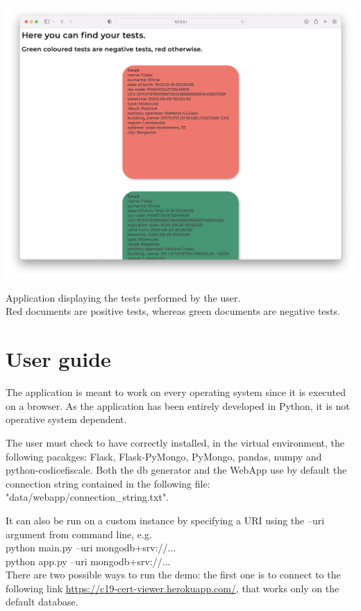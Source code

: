 \documentclass{article}
\begin{document}
\begin{center}
\includegraphics[scale=0.23]{tests.png}
    \caption{Application displaying the tests performed by the user. \\Red documents are positive tests, whereas green documents are negative tests.}\end{center}


\newpage

\section{User guide}
The application is meant to work on every operating system since it is executed on a browser. As the application has been entirely developed in Python, it is not operative system dependent.

The user must check to have correctly installed, in the virtual environment, the following pacakges: {\selectfont Flask, Flask-PyMongo, PyMongo, pandas, numpy and python-codicefiscale}.
\hfill\break
Both the db generator and the WebApp use by default the connection string contained in the following file: \\ 
{\selectfont"data/webapp/connection\_string.txt"}.

It can also be run on a custom instance by specifying a URI using the --uri argument from command line, e.g.\\
{\selectfont python main.py --uri mongodb+srv://...}\\
{\selectfont python app.py --uri mongodb+srv://...}
\hfill\break
\\
There are two possible ways to run the demo: the first one is to connect to the following link \url{https://c19-cert-viewer.herokuapp.com/}, that works only on the default database.
\end{document}

